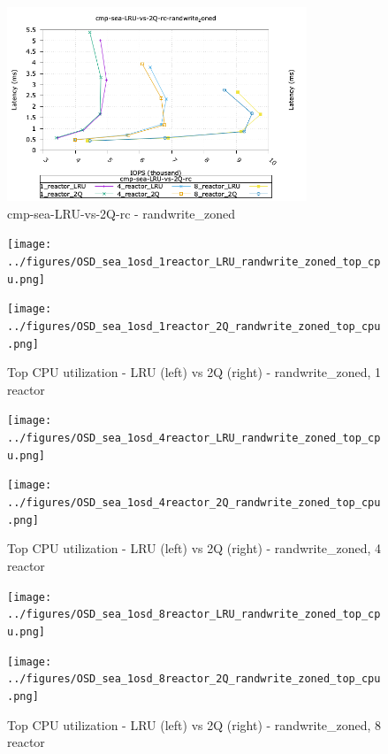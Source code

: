 \begin{figure}[!ht]
\centering
\includegraphics[width=0.8\textwidth]{../figures/cmp_sea_LRU_vs_2Q_rc_randwrite_zoned_iops_vs_lat.png}
\caption{cmp-sea-LRU-vs-2Q-rc - randwrite\_zoned}
\label{fig:cmp_sea_LRU_vs_2Q_rc_randwrite_zoned}
\end{figure}

\begin{figure}[!ht]
  \centering
  \begin{minipage}{.5\textwidth}
  \centering
    \texttt{[image: ../figures/OSD\_sea\_1osd\_1reactor\_LRU\_randwrite\_zoned\_top\_cpu.png]}
  \end{minipage}%
  \begin{minipage}{.5\textwidth}
  \centering
    \texttt{[image: ../figures/OSD\_sea\_1osd\_1reactor\_2Q\_randwrite\_zoned\_top\_cpu.png]}
  \end{minipage}%
  \caption{Top CPU utilization - LRU (left) vs 2Q (right) - randwrite\_zoned, 1 reactor}
  \label{figure:1-reactor-cpu-randwrite_zoned}
\end{figure}


\begin{figure}[!ht]
  \centering
  \begin{minipage}{.5\textwidth}
  \centering
    \texttt{[image: ../figures/OSD\_sea\_1osd\_4reactor\_LRU\_randwrite\_zoned\_top\_cpu.png]}
  \end{minipage}%
  \begin{minipage}{.5\textwidth}
  \centering
    \texttt{[image: ../figures/OSD\_sea\_1osd\_4reactor\_2Q\_randwrite\_zoned\_top\_cpu.png]}
  \end{minipage}%
  \caption{Top CPU utilization - LRU (left) vs 2Q (right) - randwrite\_zoned, 4 reactor}
  \label{figure:4-reactor-cpu-randwrite_zoned}
\end{figure}

\begin{figure}[!ht]
  \centering
  \begin{minipage}{.5\textwidth}
  \centering
    \texttt{[image: ../figures/OSD\_sea\_1osd\_8reactor\_LRU\_randwrite\_zoned\_top\_cpu.png]}
  \end{minipage}%
  \begin{minipage}{.5\textwidth}
  \centering
    \texttt{[image: ../figures/OSD\_sea\_1osd\_8reactor\_2Q\_randwrite\_zoned\_top\_cpu.png]}
  \end{minipage}%
  \caption{Top CPU utilization - LRU (left) vs 2Q (right) - randwrite\_zoned, 8 reactor}
  \label{figure:8-reactor-cpu-randwrite_zoned}
\end{figure}



